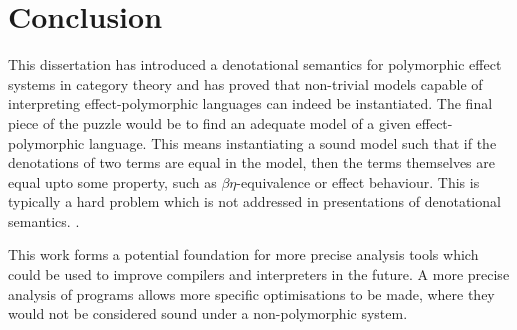 \documentclass{Report}
\begin{document}
\chapter{Conclusion}

This dissertation has introduced a denotational semantics for polymorphic effect systems in category theory and has proved that non-trivial models capable of interpreting effect-polymorphic languages can indeed be instantiated. The final piece of the puzzle would be to find an adequate model of a given effect-polymorphic language. This means instantiating a sound model such that if the denotations of two terms are equal in the model, then the terms themselves are equal upto some property, such as $\beta\eta$-equivalence or effect behaviour. This is typically a hard problem which is not addressed in presentations of denotational semantics. .

This work forms a potential foundation for more precise analysis tools which could be used to improve compilers and interpreters in the future. A more precise analysis of programs allows more specific optimisations to be made, where they would not be considered sound under a non-polymorphic system.
\end{document}
